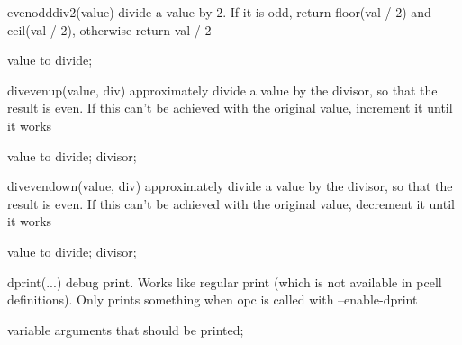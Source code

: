 \begin{APIfunc}{evenodddiv2(value)}
    divide a value by 2. If it is odd, return floor(val / 2) and ceil(val / 2), otherwise return val / 2
    \begin{APIparameters}
            value to divide;
    \end{APIparameters}
\end{APIfunc}
\begin{APIfunc}{divevenup(value, div)}
    approximately divide a value by the divisor, so that the result is even. If this can't be achieved with the original value, increment it until it works
    \begin{APIparameters}
            value to divide;
            divisor;
    \end{APIparameters}
\end{APIfunc}
\begin{APIfunc}{divevendown(value, div)}
    approximately divide a value by the divisor, so that the result is even. If this can't be achieved with the original value, decrement it until it works
    \begin{APIparameters}
            value to divide;
            divisor;
    \end{APIparameters}
\end{APIfunc}
\begin{APIfunc}{dprint(...)}
    debug print. Works like regular print (which is not available in pcell definitions). Only prints something when opc is called with --enable-dprint
    \begin{APIparameters}
            variable arguments that should be printed;
    \end{APIparameters}
\end{APIfunc}
